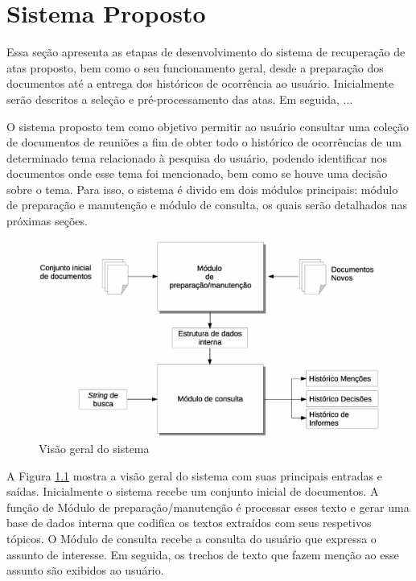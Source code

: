 \chapter{Sistema Proposto}\label{cap3}

Essa seção apresenta as etapas de desenvolvimento do sistema de recuperação de atas proposto, bem como o seu funcionamento geral, desde a preparação dos documentos até a entrega dos históricos de ocorrência ao usuário. Inicialmente serão descritos a seleção e pré-processamento das atas. Em seguida, ... 


O sistema proposto tem como objetivo permitir ao usuário consultar uma coleção de documentos de reuniões a fim de obter todo o histórico de ocorrências de um determinado tema relacionado à pesquisa do usuário, podendo identificar nos documentos onde esse tema foi mencionado, bem como se houve uma decisão sobre o tema. Para isso, o sistema é divido em dois módulos principais: módulo de preparação e manutenção e módulo de consulta, os quais serão detalhados nas próximas seções.  %


  \begin{figure}[!h]
	  \centering
	  \includegraphics[width=0.69\paperwidth]{conteudo/capitulos/figs/visao-geral-3.eps}
	  \caption{Visão geral do sistema}
	  \label{fig:visao-geral}
  \end{figure}

A Figura \ref{fig:visao-geral} mostra a visão geral do sistema com suas principais entradas e saídas. Inicialmente o sistema recebe um conjunto inicial de documentos. A função de Módulo de preparação/manutenção é processar esses texto e gerar uma base de dados interna que codifica os textos extraídos com seus respetivos tópicos. O Módulo de consulta recebe a consulta do usuário que expressa o assunto de interesse. Em seguida, os trechos de texto que fazem menção ao esse assunto são exibidos ao usuário.


